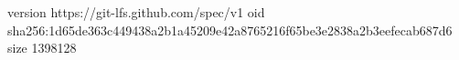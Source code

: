 version https://git-lfs.github.com/spec/v1
oid sha256:1d65de363c449438a2b1a45209e42a8765216f65be3e2838a2b3eefecab687d6
size 1398128
